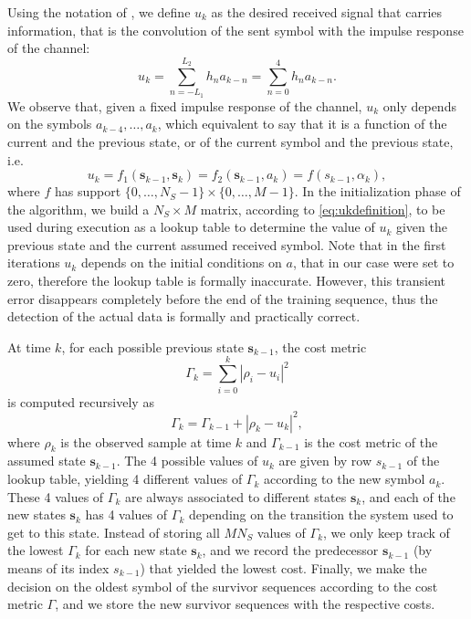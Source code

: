 \documentclass[10pt]{article}
\begin{document}
Using the notation of \cite{bc}, we define $u_k$ as the desired received signal that carries information, that is the convolution of the sent symbol with the impulse response of the channel:
\begin{equation}
u_k = \sum_{n=-L_1}^{L_2} h_n a_{k-n} = \sum_{n=0}^{4} h_n a_{k-n}.
\label{eq:ukdefinition}\end{equation}
We observe that, given a fixed impulse response of the channel, $u_k$ only depends on the symbols $a_{k-4},\ldots, a_k$, which equivalent to say that it is a function of the current and the previous state, or of the current symbol and the previous state, i.e.
\begin{equation}
u_k = f_1(\mathbf{s}_{k-1}, \mathbf{s}_k) = f_2(\mathbf{s}_{k-1}, a_k) = f(s_{k-1}, \alpha_k),
\end{equation}
where $f$ has support $\{0,\ldots,N_S-1\} \times \{0,\ldots,M-1\}$. In the initialization phase of the algorithm, we build a $N_S \times M$ matrix, according to \eqref{eq:ukdefinition}, to be used during execution as a lookup table to determine the value of $u_k$ given the previous state and the current assumed received symbol. Note that in the first iterations $u_k$ depends on the initial conditions on $a$, that in our case were set to zero, therefore the lookup table is formally inaccurate. However, this transient error disappears completely before the end of the training sequence, thus the detection of the actual data is formally and practically correct.

At time $k$, for each possible previous state $\mathbf{s}_{k-1}$, the cost metric
\begin{equation}
\Gamma_k = \sum_{i=0}^k |\rho_i - u_i|^2
\end{equation}
is computed recursively as
\begin{equation}
\Gamma_k = \Gamma_{k-1} + |\rho_k - u_k|^2,
\end{equation}
where $\rho_k$ is the observed sample at time $k$ and $\Gamma_{k-1}$ is the cost metric of the assumed state $\mathbf{s}_{k-1}$. The 4 possible values of $u_k$ are given by row $s_{k-1}$ of the lookup table, yielding 4 different values of $\Gamma_k$ according to the new symbol $a_k$. These 4 values of $\Gamma_k$ are always associated to different states $\mathbf{s}_k$, and each of the new states $\mathbf{s}_k$ has 4 values of $\Gamma_k$ depending on the transition the system used to get to this state. Instead of storing all $MN_S$ values of $\Gamma_k$, we only keep track of the lowest $\Gamma_k$ for each new state $\mathbf{s}_k$, and we record the predecessor $\mathbf{s}_{k-1}$ (by means of its index $s_{k-1}$) that yielded the lowest cost. Finally, we make the decision on the oldest symbol of the survivor sequences according to the cost metric $\Gamma$, and we store the new survivor sequences with the respective costs.
\end{document}
